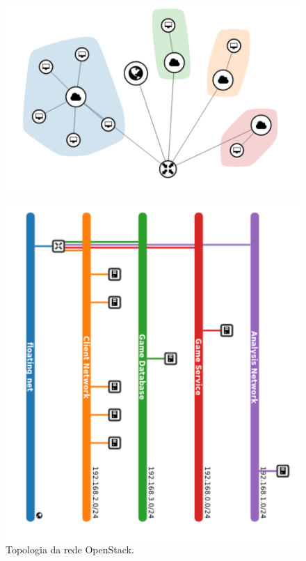 \begin{figure}[htb!]
    \begin{minipage}[c]{0.5\linewidth}
        \centering
\includegraphics[width=\textwidth]{img/cap5/topology_graph.png}

\end{minipage}
\begin{minipage}[c]{0.45\linewidth}
    \centering
        \label{fig:topologia}
        \caption{Topologia da rede OpenStack.}
        \includegraphics[width=\textwidth]{img/cap5/topology.png}
       
      
    \end{minipage}
      \label{fig:topologia}
\end{figure}

